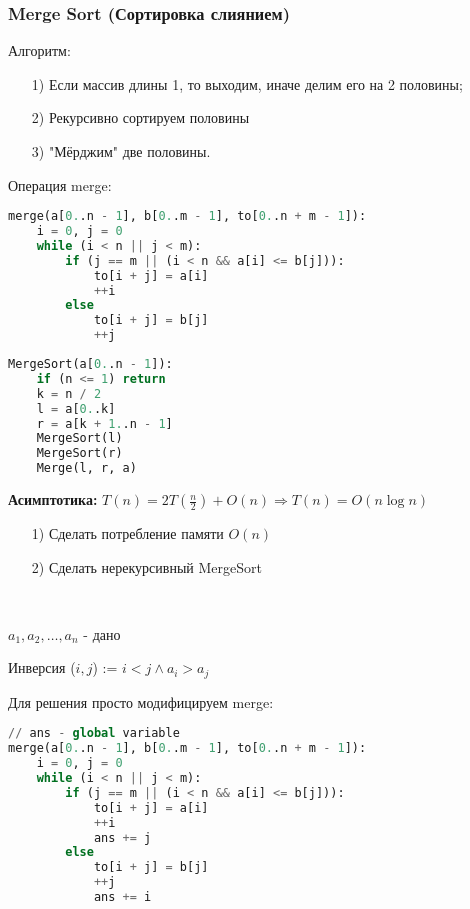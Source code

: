\subsubsection{Merge Sort (Сортировка слиянием)}
Алгоритм:
\begin{enumerate}
    \item [1) ] Если массив длины 1, то выходим, иначе делим его на 2 половины;
    \item [2) ] Рекурсивно сортируем половины
    \item [3) ] "Мёрджим" две половины.
\end{enumerate}
Операция merge:
\lstset{style=mystyle}
\begin{lstlisting}[language=Python, caption=Merge]
merge(a[0..n - 1], b[0..m - 1], to[0..n + m - 1]):
    i = 0, j = 0
    while (i < n || j < m):
        if (j == m || (i < n && a[i] <= b[j])):
            to[i + j] = a[i]
            ++i
        else
            to[i + j] = b[j]
            ++j
\end{lstlisting}
\lstset{style=mystyle}
\begin{lstlisting}[language=Python, caption=MergeSort]
MergeSort(a[0..n - 1]):
    if (n <= 1) return
    k = n / 2
    l = a[0..k]
    r = a[k + 1..n - 1]
    MergeSort(l)
    MergeSort(r)
    Merge(l, r, a)
\end{lstlisting}
\textbf{Асимптотика:} $T(n) = 2T(\frac{n}{2}) + O(n) \Rightarrow T(n) = O(n\log n)$

\begin{task}
    \begin{enumerate}
        \item [1) ] Сделать потребление памяти $O(n)$
        \item [2) ] Сделать нерекурсивный MergeSort
    \end{enumerate}
\end{task}

\begin{task}
~\newline

$a_1, a_2, \ldots , a_n$ - дано

Инверсия ($i, j$) := $ i < j \land a_i > a_j$
\end{task}
\begin{solution}
Для решения просто модифицируем merge:

\lstset{style=mystyle}
\begin{lstlisting}[language=Python, caption=Merge for inversions]
// ans - global variable
merge(a[0..n - 1], b[0..m - 1], to[0..n + m - 1]):
    i = 0, j = 0
    while (i < n || j < m):
        if (j == m || (i < n && a[i] <= b[j])):
            to[i + j] = a[i]
            ++i
            ans += j
        else
            to[i + j] = b[j]
            ++j
            ans += i
\end{lstlisting}
\end{solution}

